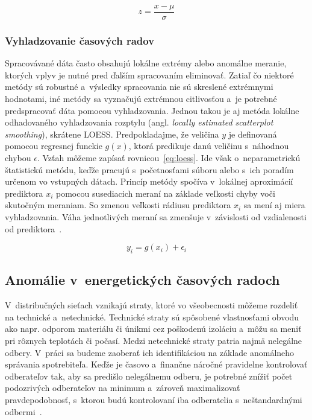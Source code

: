 \documentclass[a4paper,twoside,slovak,12pt,appendix]{article}
\begin{document}
\begin{equation}
	\label{eq:z-score}
  z = \frac{x-\mu}{\sigma}
\end{equation}

\subsubsection{Vyhladzovanie časových radov}
\label{c:ts-smoothing}
Spracovávané dáta často obsahujú lokálne extrémy alebo anomálne meranie, ktorých
vplyv je nutné pred ďalším spracovaním eliminovať. Zatiaľ čo niektoré metódy sú
robustné a~výsledky spracovania nie sú skreslené extrémnymi hodnotami, iné
metódy sa vyznačujú extrémnou citlivosťou a~je potrebné predspracovať dáta
pomocou vyhladzovania. Jednou takou je aj metóda lokálne odhadovaného
vyhladzovania rozptylu (angl. \textit{locally estimated scatterplot smoothing}),
skrátene LOESS. Predpokladajme, že veličina $y$ je definovaná pomocou regresnej
funckie $g(x)$, ktorá predikuje danú veličinu s~náhodnou chybou $\epsilon$.
Vzťah môžeme zapísať rovnicou~\ref{eq:loess}. Ide však o~neparametrickú
štatistickú metódu, keďže pracujú s~početnosťami súboru alebo s~ich poradím
určenom vo vstupných dátach. Princíp metódy spočíva v~lokálnej aproximácií
prediktora $x_i$ pomocou susediacich meraní na základe veľkosti chyby voči
skutočným meraniam. So zmenou veľkosti rádiusu prediktora $x_i$ sa mení aj miera
vyhladzovania. Váha jednotlivých meraní sa zmenšuje v~závislosti od vzdialenosti
od prediktora~\cite{Cohen1999}.

\begin{equation}
	\label{eq:loess}
  y_i = g(x_i) + \epsilon_i
\end{equation}


\subsection{Anomálie v~energetických časových radoch}
V~distribučných sieťach vznikajú straty, ktoré vo všeobecnosti môžeme rozdeliť
na technické a~netechnické. Technické straty sú spôsobené vlastnosťami
obvodu ako napr. odporom materiálu či únikmi cez poškodenú izoláciu a~môžu sa
meniť pri rôznych teplotách či počasí. Medzi netechnické straty patria najmä
nelegálne odbery. V~práci sa budeme zaoberať ich identifikáciou na základe
anomálneho správania spotrebiteľa. Keďže je časovo a~finančne náročné
pravidelne kontrolovať odberateľov tak, aby sa predišlo nelegálnemu odberu,
je potrebné znížiť počet podozrivých odberateľov na minimum a~zároveň
maximalizovať pravdepodobnosť, s~ktorou budú kontrolovaní iba odberatelia
s~neštandardnými odbermi~\cite{Coma-Puig2016,Sahoo2015}.
\end{document}
